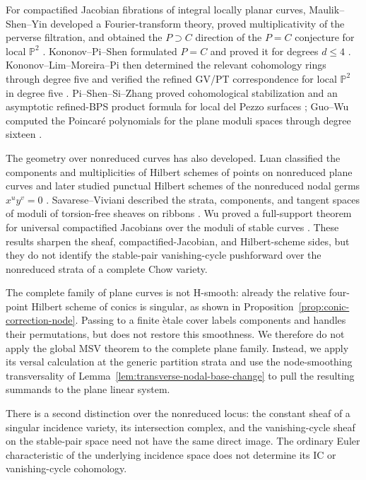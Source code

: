 \documentclass[11pt,reqno]{amsart}
\theoremstyle{definition}
\newcommand{\Pp}{\mathbb P}
\begin{document}
For compactified Jacobian fibrations of integral locally planar curves,
Maulik--Shen--Yin developed a Fourier-transform theory, proved
multiplicativity of the perverse filtration, and obtained the
$P\supset C$ direction of the $P=C$ conjecture for local $\Pp^2$
\cite{MaulikShenYin}.  Kononov--Pi--Shen formulated $P=C$ and proved it for
degrees $d\le4$ \cite{KononovPiShen}.  Kononov--Lim--Moreira--Pi then
determined the relevant cohomology rings through degree five and verified
the refined GV/PT correspondence for local $\Pp^2$ in degree five
\cite{KononovLimMoreiraPi}.  Pi--Shen--Si--Zhang proved cohomological
stabilization and an asymptotic refined-BPS product formula for local del
Pezzo surfaces \cite{PiShenSiZhang}; Guo--Wu computed the Poincar\'e
polynomials for the plane moduli spaces through degree sixteen
\cite{GuoWu}.

The geometry over nonreduced curves has also developed.  Luan classified
the components and multiplicities of Hilbert schemes of points on
nonreduced plane curves \cite{LuanNonreduced} and later studied punctual
Hilbert schemes of the nonreduced nodal germs $x^uy^v=0$
\cite{LuanNodal}.  Savarese--Viviani described the strata, components, and
tangent spaces of moduli of torsion-free sheaves on ribbons
\cite{SavareseViviani}.  Wu proved a full-support theorem for universal
compactified Jacobians over the moduli of stable curves
\cite{WuUniversalJacobian}.  These results sharpen the sheaf,
compactified-Jacobian, and Hilbert-scheme sides, but they do not identify the
stable-pair vanishing-cycle pushforward over the nonreduced strata of a
complete Chow variety.

The complete family of plane curves is not H-smooth: already the relative
four-point Hilbert scheme of conics is singular, as shown in
Proposition~\ref{prop:conic-correction-node}.  Passing to a finite \`etale
cover labels components and handles their permutations, but does not restore
this smoothness.  We therefore do not apply the global MSV theorem to the
complete plane family.  Instead, we apply its versal calculation at the
generic partition strata and use the node-smoothing transversality of
Lemma~\ref{lem:transverse-nodal-base-change} to pull the resulting summands
to the plane linear system.

There is a second distinction
over the nonreduced locus: the constant sheaf of a singular incidence
variety, its intersection complex, and the vanishing-cycle sheaf on the
stable-pair space need not have the same direct image.  The ordinary Euler
characteristic of the underlying incidence space does not determine its IC
or vanishing-cycle cohomology.
\end{document}
